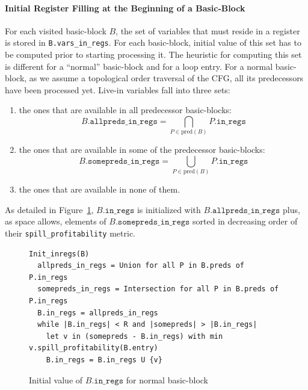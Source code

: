 {\paragraph{Initial Register Filling at the Beginning of a Basic-Block}
For each visited basic-block $B$, the set of variables that must reside in a register is stored in \verb+B.vars_in_regs+.
For each basic-block, initial value of this set has to be computed prior to starting processing it.
The heuristic for computing this set is different for a ``normal'' basic-block and for a loop entry.
For a normal basic-block, as we assume a topological order traversal of the CFG, all its predecessors have been processed yet.
Live-in variables fall into three sets:
\begin{enumerate}
\item the ones that are available in all predecessor basic-blocks:
  $$B.\texttt{allpreds\_in\_regs}=\bigcap_{P\in \textrm{pred}(B)} P.\texttt{in\_regs}$$
\item the ones that are available in some of the predecessor basic-blocks:
  $$B.\texttt{somepreds\_in\_regs}=\bigcup_{P\in \textrm{pred}(B)} P.\texttt{in\_regs}$$
\item the ones that are available in none of them.
\end{enumerate}
As detailed in Figure~\ref{fig:ra:initnormal}, $B.\texttt{in\_regs}$ is initialized with $B.\texttt{allpreds\_in\_regs}$ plus, as space allows, elements of $B.\texttt{somepreds\_in\_regs}$ sorted in decreasing order of their \texttt{spill\_profitability} metric.

\begin{figure}
\begin{verbatim}
Init_inregs(B)
  allpreds_in_regs = Union for all P in B.preds of P.in_regs
  somepreds_in_regs = Intersection for all P in B.preds of P.in_regs
  B.in_regs = allpreds_in_regs
  while |B.in_regs| < R and |somepreds| > |B.in_regs|
    let v in (somepreds - B.in_regs) with min v.spill_profitability(B.entry)
    B.in_regs = B.in_regs U {v}
\end{verbatim}
\caption{\label{fig:ra:initnormal}Initial value of $B.\texttt{in\_regs}$ for normal basic-block}
\end{figure}

}
